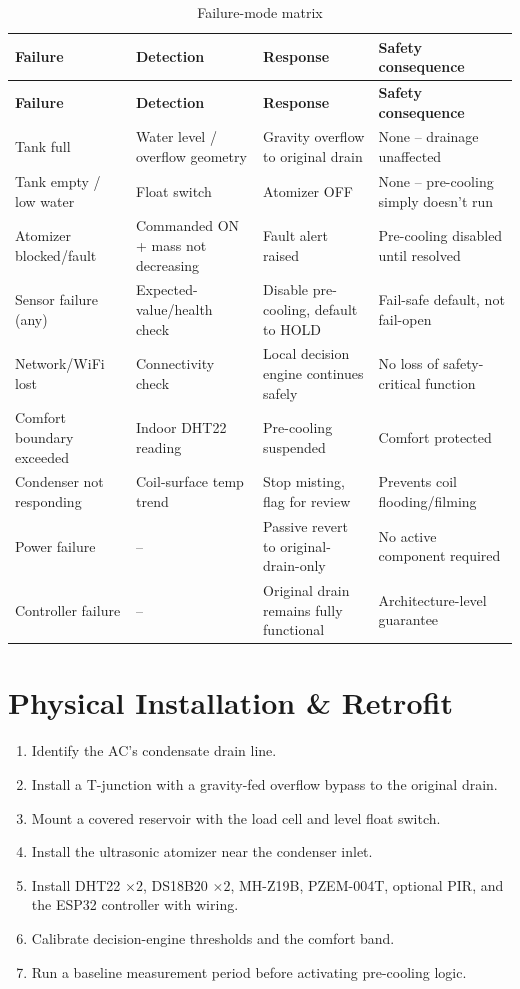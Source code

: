 \documentclass[11pt,a4paper]{article}
\begin{document}
\begin{longtable}{p{2.8cm}p{3.6cm}p{4.2cm}p{3.5cm}}
\caption{Failure-mode matrix} \\
\toprule
\textbf{Failure} & \textbf{Detection} & \textbf{Response} & \textbf{Safety consequence} \\
\midrule
\endfirsthead
\toprule
\textbf{Failure} & \textbf{Detection} & \textbf{Response} & \textbf{Safety consequence} \\
\midrule
\endhead
Tank full & Water level / overflow geometry & Gravity overflow to original drain & None -- drainage unaffected \\
Tank empty / low water & Float switch & Atomizer OFF & None -- pre-cooling simply doesn't run \\
Atomizer blocked/fault & Commanded ON + mass not decreasing & Fault alert raised & Pre-cooling disabled until resolved \\
Sensor failure (any) & Expected-value/health check & Disable pre-cooling, default to HOLD & Fail-safe default, not fail-open \\
Network/WiFi lost & Connectivity check & Local decision engine continues safely & No loss of safety-critical function \\
Comfort boundary exceeded & Indoor DHT22 reading & Pre-cooling suspended & Comfort protected \\
Condenser not responding & Coil-surface temp trend & Stop misting, flag for review & Prevents coil flooding/filming \\
Power failure & -- & Passive revert to original-drain-only & No active component required \\
Controller failure & -- & Original drain remains fully functional & Architecture-level guarantee \\
\bottomrule
\end{longtable}

\section{Physical Installation \& Retrofit}

\begin{enumerate}
    \item Identify the AC's condensate drain line.
    \item Install a T-junction with a gravity-fed overflow bypass to the original drain.
    \item Mount a covered reservoir with the load cell and level float switch.
    \item Install the ultrasonic atomizer near the condenser inlet.
    \item Install DHT22 $\times2$, DS18B20 $\times2$, MH-Z19B, PZEM-004T, optional PIR, and the ESP32 controller with wiring.
    \item Calibrate decision-engine thresholds and the comfort band.
    \item Run a baseline measurement period before activating pre-cooling logic.
\end{enumerate}
\end{document}
